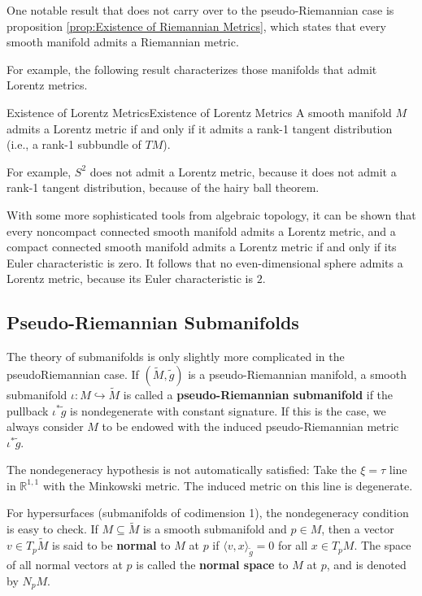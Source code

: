 \documentclass[../main.tex]{subfiles}
\begin{document}
One notable result that does not carry over to the pseudo-Riemannian case is proposition \ref{prop:Existence of Riemannian Metrics}, which states that every smooth manifold admits a Riemannian metric.

For example, the following result characterizes those manifolds that admit Lorentz metrics.

\begin{theorem}{Existence of Lorentz Metrics}{Existence of Lorentz Metrics}
	A smooth manifold $M$ admits a Lorentz metric if and only if it admits a rank-1 tangent distribution (i.e., a rank-1 subbundle of $TM$).
\end{theorem}
\begin{remark}
	For example, $S^2$ does not admit a Lorentz metric, because it does not admit a rank-1 tangent distribution, because of the hairy ball theorem.

	With some more sophisticated tools from algebraic topology, it can be shown that every noncompact connected smooth manifold admits a Lorentz metric, and a compact connected smooth manifold admits a Lorentz metric if and only if its Euler characteristic is zero. It follows that no even-dimensional sphere admits a Lorentz metric, because its Euler characteristic is $2$.
\end{remark}

\subsection{Pseudo-Riemannian Submanifolds}
The theory of submanifolds is only slightly more complicated in the pseudoRiemannian case. If $(\tilde{M}, \tilde{g})$ is a pseudo-Riemannian manifold, a smooth submanifold $\iota: M \hookrightarrow \tilde{M}$ is called a \textbf{pseudo-Riemannian submanifold} if the pullback $\iota^* \tilde{g}$ is nondegenerate with constant signature. If this is the case, we always consider $M$ to be endowed with the induced pseudo-Riemannian metric $\iota^* \tilde{g}$.
\begin{remark}
	The nondegeneracy hypothesis is not automatically satisfied: Take the $\xi = \tau$ line in $\mathbb{R}^{1, 1}$ with the Minkowski metric. The induced metric on this line is degenerate.
\end{remark}

For hypersurfaces (submanifolds of codimension 1), the nondegeneracy condition is easy to check. If $M \subseteq \tilde{M}$ is a smooth submanifold and $p \in M$, then a vector $v \in T_p \tilde{M}$ is said to be \textbf{normal} to $M$ at $p$ if $\langle v, x \rangle_{\tilde{g}} = 0$ for all $x \in T_pM$. The space of all normal vectors at $p$ is called the \textbf{normal space} to $M$ at $p$, and is denoted by $N_pM$.
\end{document}
